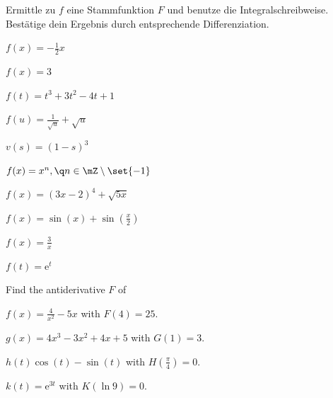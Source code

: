 \documentclass[%
11pt,%
twoside,%
titlepage,%
german,%
headsepline%
]{scrartcl}
\begin{document}
\begin{ueb}[Stammfunktion]
Ermittle zu $f$ eine Stammfunktion $F$ und benutze die Integralschreibweise. Bestätige dein Ergebnis durch entsprechende Differenziation.

\begin{minipage}{0.5\textwidth}
\begin{enumeratea}
\item $f(x)=-\frac{1}{2}x$
\item $f(x)=3$
\item $f(t)=t^3+3t^2-4t+1$
\item $f(u)=\frac{1}{\sqrt{u}}+\sqrt{u}$
\item $v(s)=(1-s)^3$
\end{enumeratea}
\end{minipage}
\begin{minipage}{0.5\textwidth}
\begin{enumeratea}
\setcounter{enumi}{5}
\item $f(x)=x^n,\q n\in\mZ\setminus\set{-1}$
\item $f(x)=(3x-2)^4+\sqrt{5x}$
\item $f(x)=\sin(x)+\sin(\frac{x}{2})$
\item $f(x)=\frac{3}{x}$
\item $f(t)=\mathrm{e}^t$
\end{enumeratea}
\end{minipage}
\end{ueb}

\begin{ueb}[Antiableitung]
Find the antiderivative $F$ of

\begin{minipage}{0.5\textwidth}
\begin{enumeratea}
\item $f(x)=\frac{4}{x^2}-5x$ with $F(4)=25$.
\item $g(x)=4x^3-3x^2+4x+5$ with $G(1)=3$.
\end{enumeratea}
\end{minipage}
\begin{minipage}{0.5\textwidth}
\begin{enumeratea}
\setcounter{enumi}{2}
\item $h(t)\cos(t)-\sin(t)$ with $H(\frac{\pi}{4})=0$.
\item $k(t)=\mathrm{e}^{3t}$ with $K(\ln 9)=0$.
\end{enumeratea}
\end{minipage}
\end{ueb}
\end{document}

